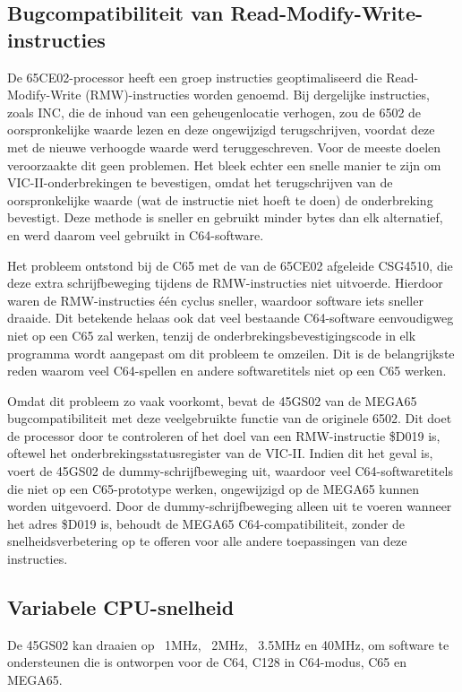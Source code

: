 \subsection{Bugcompatibiliteit van Read-Modify-Write-instructies}

De 65CE02-processor heeft een groep instructies geoptimaliseerd die Read-Modify-Write (RMW)-instructies worden genoemd. Bij dergelijke instructies, zoals INC, die de inhoud van een geheugenlocatie verhogen, zou de 6502 de oorspronkelijke waarde lezen en deze ongewijzigd terugschrijven, voordat deze met de nieuwe verhoogde waarde werd teruggeschreven. Voor de meeste doelen veroorzaakte dit geen problemen. Het bleek echter een snelle manier te zijn om VIC-II-onderbrekingen te bevestigen, omdat het terugschrijven van de oorspronkelijke waarde (wat de instructie niet hoeft te doen) de onderbreking bevestigt. Deze methode is sneller en gebruikt minder bytes dan elk alternatief, en werd daarom veel gebruikt in C64-software.

Het probleem ontstond bij de C65 met de van de 65CE02 afgeleide CSG4510, die deze extra schrijfbeweging tijdens de RMW-instructies niet uitvoerde. Hierdoor waren de RMW-instructies één cyclus sneller, waardoor software iets sneller draaide. Dit betekende helaas ook dat veel bestaande C64-software eenvoudigweg niet op een C65 zal werken, tenzij de onderbrekingsbevestigingscode in elk programma wordt aangepast om dit probleem te omzeilen. Dit is de belangrijkste reden waarom veel C64-spellen en andere softwaretitels niet op een C65 werken.

Omdat dit probleem zo vaak voorkomt, bevat de 45GS02 van de MEGA65 bugcompatibiliteit met deze veelgebruikte functie van de originele 6502. Dit doet de processor door te controleren of het doel van een RMW-instructie \$D019 is, oftewel het onderbrekingsstatusregister van de VIC-II. Indien dit het geval is, voert de 45GS02 de dummy-schrijfbeweging uit, waardoor veel C64-softwaretitels die niet op een C65-prototype werken, ongewijzigd op de MEGA65 kunnen worden uitgevoerd. Door de dummy-schrijfbeweging alleen uit te voeren wanneer het adres \$D019 is, behoudt de MEGA65 C64-compatibiliteit, zonder de snelheidsverbetering op te offeren voor alle andere toepassingen van deze instructies.

\subsection{Variabele CPU-snelheid}

De 45GS02 kan draaien op ~1MHz, ~2MHz, ~3.5MHz en 40MHz, om software te ondersteunen die is ontworpen voor de C64, C128 in C64-modus, C65 en MEGA65.

